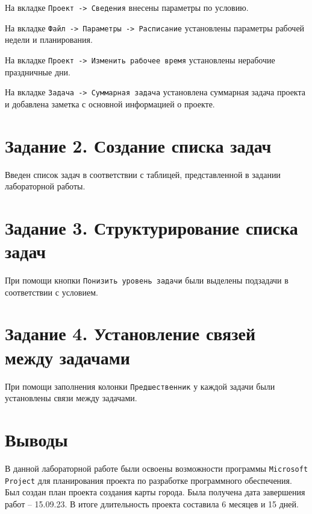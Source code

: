 \documentclass{bmstu}
\begin{document}
На вкладке \texttt{Проект -> Сведения} внесены параметры по условию.


На вкладке \texttt{Файл -> Параметры -> Расписание} установлены параметры рабочей недели и планирования.


\clearpage

На вкладке \texttt{Проект -> Изменить рабочее время} установлены нерабочие праздничные дни.


На вкладке \texttt{Задача -> Суммарная задача} установлена суммарная задача проекта и добавлена заметка с основной информацией о проекте.


\clearpage

\section*{Задание 2. Создание списка задач}

Введен список задач в соответствии с таблицей, представленной в задании лабораторной работы.


\section*{Задание 3. Структурирование списка задач}

При помощи кнопки \texttt{Понизить уровень задачи} были выделены подзадачи в соответствии с условием.


\clearpage

\section*{Задание 4. Установление связей между задачами}

При помощи заполнения колонки \texttt{Предшественник} у каждой задачи были установлены связи между задачами.


\section*{Выводы}

В данной лабораторной работе были освоены возможности программы \texttt{Microsoft Project} для планирования проекта по разработке программного обеспечения. Был создан план проекта создания карты города. Была получена дата завершения работ -- 15.09.23. В итоге длительность проекта составила 6 месяцев и 15 дней.
\end{document}
